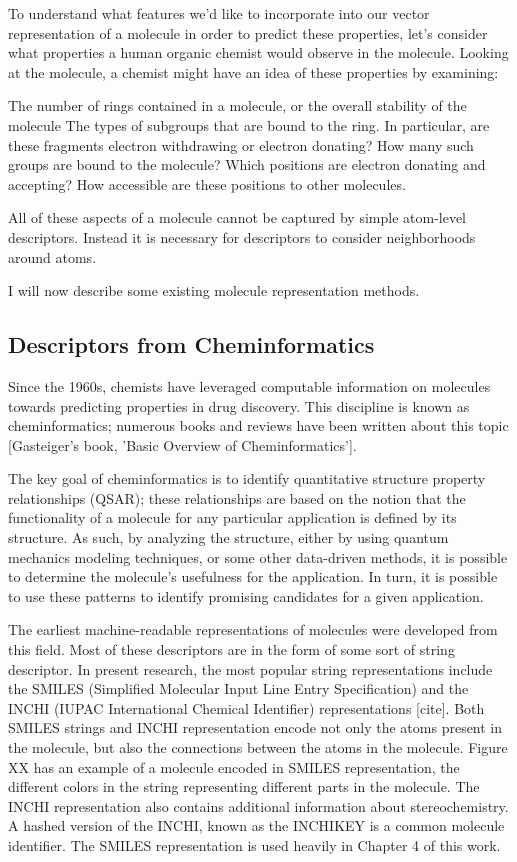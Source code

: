 To understand what features we'd like to incorporate into our vector representation of a molecule in order to predict these properties, let's consider what properties a human organic chemist would observe in the molecule. Looking at the molecule, a chemist might have an idea of these properties by examining:

The number of rings contained in a molecule, or the overall stability of the molecule
The types of subgroups that are bound to the ring. In particular, are these fragments electron withdrawing or electron donating?
How many such groups are bound to the molecule?
Which positions are electron donating and accepting? How accessible are these positions to other molecules.

All of these aspects of a molecule cannot be captured by simple atom-level descriptors. Instead it is necessary for descriptors to consider neighborhoods around atoms.

I will now describe some existing molecule representation methods.

\subsection{Descriptors from Cheminformatics}

Since the 1960s, chemists have leveraged computable information on molecules towards predicting properties in drug discovery. This discipline is known as cheminformatics; numerous books and reviews have been written about this topic [Gasteiger's book, 'Basic Overview of Cheminformatics']. 

The key goal of cheminformatics is to identify quantitative structure property relationships (QSAR); these relationships are based on the notion that the functionality of a molecule for any particular application is defined by its structure. As such, by analyzing the structure, either by using quantum mechanics modeling techniques, or some other data-driven methods, it is possible to determine the molecule's usefulness for the application. In turn, it is possible to use these patterns to identify promising candidates for a given application.

The earliest machine-readable representations of molecules were developed from this field. Most of these descriptors are in the form of some sort of string descriptor. In present research, the most popular string representations include the SMILES (Simplified Molecular Input Line Entry Specification) and the INCHI (IUPAC International Chemical Identifier) representations [cite].  Both SMILES strings and INCHI representation encode not only the atoms present in the molecule, but also the connections between the atoms in the molecule. Figure XX has an example of a molecule encoded in SMILES representation, the different colors in the string representing different parts in the molecule. The INCHI representation also contains additional information about stereochemistry. A hashed version of the INCHI, known as the INCHIKEY is a common molecule identifier. The SMILES representation is used heavily in Chapter 4 of this work.

